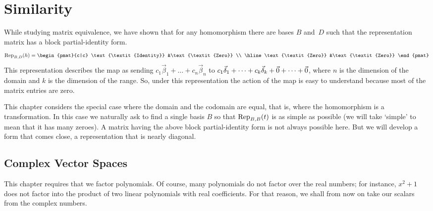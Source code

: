 \chapter{Similarity}
While studying matrix equivalence, we have shown that for any 
homomorphism there are bases $B$ and~$D$ such that the 
representation matrix has a block partial-identity form.
\begin{equation*}
  \rep{h}{B,D}
  =
    \begin{pmat}{c|c}
       \text{\textit{Identity}}  &\text{\textit{Zero}}   \\
       \hline
       \text{\textit{Zero}}      &\text{\textit{Zero}}
    \end{pmat}
\end{equation*}
This representation describes
the map as sending
\( c_1\vec{\beta}_1+\dots+c_n\vec{\beta}_n \) to
\(c_1\vec{\delta}_1+\dots+c_k\vec{\delta}_k+\zero+\dots+\zero \),
where $n$ is the dimension of the domain and \( k \) is the dimension of
the range.
So, under this representation 
the action of the map is easy to understand 
because most of the matrix entries are zero.

This chapter considers the special case where the domain and
the codomain are equal, that is, where
the homomorphism is a transformation.
In this case we naturally ask to find a single basis
\( B \) so that \( \rep{t}{B,B} \) is as simple as possible
(we will take `simple' to mean that it has many zeroes).
A matrix having the above block partial-identity form
is not always possible here.
But we will develop a form that comes close, a
representation that is nearly diagonal.













\section{Complex Vector Spaces}
This chapter requires that we factor polynomials.
Of course, many polynomials do not factor over the real numbers;
for instance,
\( x^2+1 \) does not factor into the product of two linear polynomials
with real coefficients.
For that reason, we shall from now on take our scalars from the complex
numbers.


